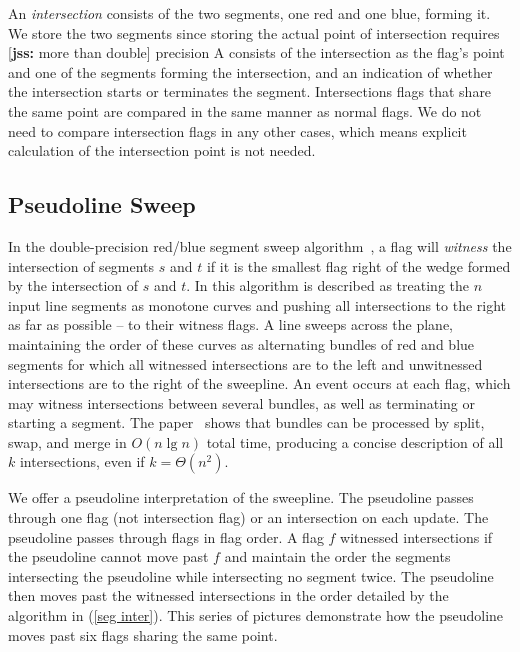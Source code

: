 \documentclass[11pt]{article}
\def\sm#1{{\footnotesize [{\bf jss:} #1]}}
\begin{document}
An \textit{intersection} consists of the two segments, one red and one blue, forming it.
We store the two segments since storing the actual point of intersection requires \sm{more than double} precision
A  consists of the intersection as the flag's point and one of the segments forming the intersection, and an indication of whether the intersection starts or terminates the segment.
Intersections flags that share the same point are compared in the same manner as normal flags.
We do not need to compare intersection flags in any other cases, which means explicit calculation of the intersection point is not needed.


\subsection{Pseudoline Sweep}\label{sec psweep}
In the double-precision red/blue segment sweep algorithm~\cite{MS}, a flag will \textit{witness} the intersection of segments $s$ and $t$ if it is the smallest flag right of the wedge formed by the intersection of $s$ and $t$.
In \cite{MS} this algorithm is described as treating the $n$ input line segments as monotone curves and pushing all intersections to the right as far as possible -- to their witness flags.
A line sweeps across the plane, maintaining the order of these curves as alternating bundles of red and blue segments for which all witnessed intersections are to the left and unwitnessed intersections are to the right of the sweepline. 
An event occurs at each flag, which may witness intersections between several bundles, as well as terminating or starting a segment.  
The paper~\cite{MS} shows that bundles can be processed by split, swap, and merge in $O(n\lg n)$ total time, producing a concise description of all $k$ intersections, even if $k=\Theta(n^2)$.


We offer a pseudoline interpretation of the sweepline.
The pseudoline passes through one flag (not intersection flag) or an intersection on each update.
The pseudoline passes through flags in flag order.
A flag $f$ witnessed intersections if the pseudoline cannot move past $f$ and maintain the order the segments intersecting the pseudoline while intersecting no segment twice.
The pseudoline then moves past the witnessed intersections in the order detailed by the algorithm in (\ref{seg inter}).
This series of pictures demonstrate how the pseudoline moves past six flags sharing the same point.
\end{document}
